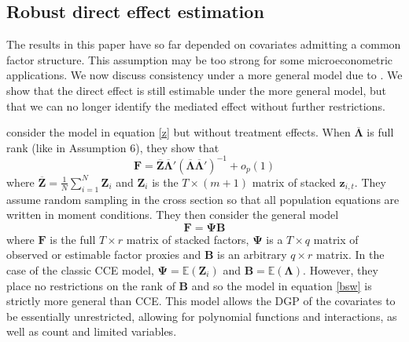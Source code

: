 \documentclass[12pt,fleqn]{article}
\def\*#1{\mathbf{#1}}
\def\+#1{\boldsymbol{#1}}
\begin{document}




\subsection{Robust direct effect estimation}


The results in this paper have so far depended on covariates admitting a common factor structure. This assumption may be too strong for some microeconometric applications. We now discuss consistency under a more general model due to \citet{Brown_Schmidt_Wooldridge_2021}. We show that the direct effect is still estimable under the more general model, but that we can no longer identify the mediated effect without further restrictions.

\citet{Brown_Schmidt_Wooldridge_2021} consider the model in equation \eqref{z} but without treatment effects. When $\overline{\+\Lambda}$ is full rank (like in Assumption 6), they show that 
\begin{equation}
    \*F = \overline{\*Z} \overline{\+\Lambda}' \left( \overline{\+\Lambda} \overline{\+\Lambda}' \right)^{-1} + o_p(1)
\end{equation}
where $\overline{\*Z} = \frac{1}{N} \sum_{i = 1}^N \*Z_i$ and $\*Z_i$ is the $T \times (m + 1)$ matrix of stacked $\*z_{i,t}$. They assume random sampling in the cross section so that all population equations are written in moment conditions. They then consider the general model 
\begin{equation}\label{bsw}
    \*F = \+\Psi \*B
\end{equation}
where $\*F$ is the full $T \times r$ matrix of stacked factors, $\+\Psi$ is a $T \times q$ matrix of observed or estimable factor proxies and $\*B$ is an arbitrary $q \times r$ matrix. In the case of the classic CCE model, $\+\Psi = \mathbb{E}(\*Z_i)$ and $\*B = \mathbb{E}(\+\Lambda)$. However, they place no restrictions on the rank of $\*B$ and so the model in equation \eqref{bsw} is strictly more general than CCE. This model allows the DGP of the covariates to be essentially unrestricted, allowing for polynomial functions and interactions, as well as count and limited variables.
\end{document}
